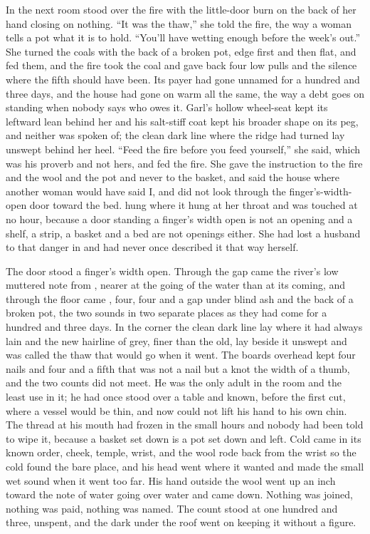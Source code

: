 \scenebreak

In the next room  stood over the fire with the little-door burn on the back of her hand closing on nothing. “It was the thaw,” she told the fire, the way a woman tells a pot what it is to hold. “You'll have wetting enough before the week's out.” She turned the coals with the back of a broken pot, edge first and then flat, and fed them, and the fire took the coal and gave back four low pulls and the silence where the fifth should have been. Its payer had gone unnamed for a hundred and three days, and the house had gone on warm all the same, the way a debt goes on standing when nobody says who owes it. Garl's hollow wheel-seat kept its leftward lean behind her and his salt-stiff coat kept his broader shape on its peg, and neither was spoken of; the clean dark line where the  ridge had turned lay unswept behind her heel. “Feed the fire before you feed yourself,” she said, which was his proverb and not hers, and fed the fire. She gave the instruction to the fire and the wool and the pot and never to the basket, and said the house where another woman would have said I, and did not look through the finger's-width-open door toward the bed.  hung where it hung at her throat and was touched at no hour, because a door standing a finger's width open is not an opening and a shelf, a strip, a basket and a bed are not openings either. She had lost a husband to that danger in  and had never once described it that way herself.

The door stood a finger's width open. Through the gap came the river's low muttered note from , nearer at the going of the water than at its coming, and through the floor came , four, four and a gap under blind ash and the back of a broken pot, the two sounds in two separate places as they had come for a hundred and three days. In the corner the clean dark line lay where it had always lain and the new hairline of grey, finer than the old, lay beside it unswept and was called the thaw that would go when it went. The boards overhead kept four nails and four and a fifth that was not a nail but a knot the width of a thumb, and the two counts did not meet. He was the only adult in the room and the least use in it; he had once stood over a table and known, before the first cut, where a vessel would be thin, and now could not lift his hand to his own chin. The thread at his mouth had frozen in the small hours and nobody had been told to wipe it, because a basket set down is a pot set down and left. Cold came in its known order, cheek, temple, wrist, and the wool rode back from the wrist so the cold found the bare place, and his head went where it wanted and made the small wet sound when it went too far. His hand outside the wool went up an inch toward the note of water going over water and came down. Nothing was joined, nothing was paid, nothing was named. The count stood at one hundred and three, unspent, and the dark under the roof went on keeping it without a figure.
